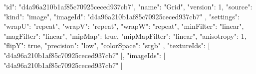 {
  "id": "d4a96a210b1af85c70925ceced937cb7",
  "name": "Grid",
  "version": 1,
  "source": {
    "kind": "image",
    "imageId": "d4a96a210b1af85c70925ceced937cb7"
  },
  "settings": {
    "wrapU": "repeat",
    "wrapV": "repeat",
    "wrapW": "repeat",
    "minFilter": "linear",
    "magFilter": "linear",
    "mipMap": true,
    "mipMapFilter": "linear",
    "anisotropy": 1,
    "flipY": true,
    "precision": "low",
    "colorSpace": "srgb"
  },
  "textureIds": [
    "d4a96a210b1af85c70925ceced937cb7"
  ],
  "imageIds": [
    "d4a96a210b1af85c70925ceced937cb7"
  ]
}
